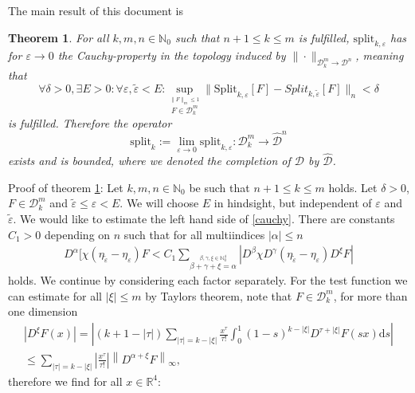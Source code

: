 \documentclass[oneside,reqno,12pt]{amsart}
\newtheorem{Thm}[Def]{Theorem}
\begin{document}
The main result of this document is 
\begin{Thm}\label{testFunctionSplitting}
For all \(k,m,n\in\mathbb{N}_0\) such that \(n+1\le k\le m\) is fulfilled, \(\text{split}_{k,\varepsilon}\) has for \(\varepsilon\rightarrow 0 \) the Cauchy-property in the topology induced by \(\|\cdot\|_{\mathcal{D}_k^m\rightarrow \mathcal{D}^n}\), meaning that 
\begin{equation}\label{cauchy}
\forall \delta>0, \exists E>0: \forall \varepsilon,\tilde{\varepsilon}<E: \sup_{\stackrel{\|F\|_m\le 1}{F\in \mathcal{D}_k^m}} \| \text{Split}_{k,\varepsilon} [F] - Split_{k,\tilde{\varepsilon}}[F]\|_n < \delta
\end{equation}
is fulfilled. Therefore the operator
\begin{equation}
\text{split}_k:=\lim_{\varepsilon\rightarrow 0 } \text{split}_{k,\varepsilon}:\mathcal{D}_k^m\rightarrow \hat{\mathcal{D}}^n
\end{equation}
exists and is bounded, where we denoted the completion of \(\mathcal{D}\) by \(\hat{\mathcal{D}}\).
\end{Thm}
Proof of theorem \ref{testFunctionSplitting}: Let \(k,m,n\in\mathbb{N}_0\) be such that \(n+1\le k \le m\) holds. Let 
\(\delta>0\), \(F\in\mathcal{D}_k^m\) and \(\tilde{\varepsilon}\le \varepsilon<E\). We will choose \(E\) in hindsight, but independent of \(\varepsilon\) and \(\tilde{\varepsilon}\). We would like to estimate the left hand side of \eqref{cauchy}. There are constants \(C_1>0\) depending on \(n\) such that for all multiindices \(|\alpha|\le n\)
\begin{align}\label{cauchy_firstEstimate}
D^\alpha [\chi (\eta_{\tilde{\varepsilon}}-\eta_\varepsilon) F< C_1 \sum_{\stackrel{\beta,\gamma,\xi\in\mathbb{N}_0^4}{\beta+\gamma+\xi = \alpha}} \left| D^\beta \chi D^\gamma (\eta_{\tilde{\varepsilon}}-\eta_\varepsilon) D^{\xi} F\right|
\end{align}
holds. We continue by considering each factor separately. For the test function we can estimate for all \(|\xi|\le m\) by Taylors theorem, note that \(F\in \mathcal{D}_k^m\), for more than one dimension
\begin{align*}
|D^\xi F(x)| =\left|(k+1-|\tau|) \sum_{|\tau|=k-|\xi|} \frac{x^\tau}{\tau!} \int_0^1 (1-s)^{k-|\xi|} D^{\tau+|\xi|} F(s x)\mathrm{d}s\right|\\
\le \sum_{|\tau|=k-|\xi|} \left| \frac{x^\tau}{\tau!} \right|  \left\|D^{\alpha+\xi} F\right\|_\infty,
\end{align*}
therefore we find for all \(x\in \mathbb{R}^4\):
\end{document}

